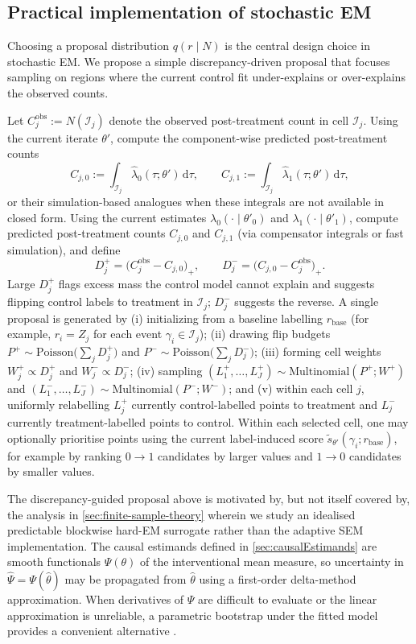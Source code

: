 \documentclass{statsoc}
\newcommand{\dd}{\mathrm{d}}
\newcommand{\1}{\mathbbm{1}}
\begin{document}
\subsection{Practical implementation of stochastic EM}\label{sec:pracImpSEM}

Choosing a proposal distribution \(q(r\mid N)\) is the central design choice in stochastic EM. We propose a simple discrepancy-driven proposal that focuses sampling on regions where the current control fit under-explains or over-explains the observed counts.

Let \(C_j^{\text{obs}}:=N(\mathcal I_j)\) denote the observed post-treatment count in cell \(\mathcal I_j\). Using the current iterate \(\theta'\), compute the component-wise predicted post-treatment counts
\[
C_{j,0}:=\int_{\mathcal I_j}\widehat\lambda_0(\tau;\theta')\,\dd\tau,
\qquad
C_{j,1}:=\int_{\mathcal I_j}\widehat\lambda_1(\tau;\theta')\,\dd\tau,
\]
or their simulation-based analogues when these integrals are not available in closed form. Using the current estimates \(\lambda_0(\cdot\mid\theta'_0)\) and \(\lambda_1(\cdot\mid\theta'_1)\), compute predicted post-treatment counts \(C_{j,0}\) and \(C_{j,1}\) (via compensator integrals or fast simulation), and define
\[
D_j^{+}=\bigl(C_j^{\text{obs}}-C_{j,0}\bigr)_+,
\qquad
D_j^{-}=\bigl(C_{j,0}-C_j^{\text{obs}}\bigr)_+.
\]
Large \(D_j^{+}\) flags excess mass the control model cannot explain and suggests flipping control labels to treatment in \(\mathcal I_j\); \(D_j^{-}\) suggests the reverse. A single proposal is generated by (i) initializing from a baseline labelling \(r_{\text{base}}\) (for example, \(r_i=Z_j\) for each event \(\gamma_i\in\mathcal I_j\)); (ii) drawing flip budgets \(P^{+}\sim\mathrm{Poisson}\!\bigl(\sum_j D_j^{+}\bigr)\) and \(P^{-}\sim\mathrm{Poisson}\!\bigl(\sum_j D_j^{-}\bigr)\); (iii) forming cell weights \(W_j^{+}\propto D_j^{+}\) and \(W_j^{-}\propto D_j^{-}\); (iv) sampling \((L_1^{+},\dots,L_J^{+})\sim\mathrm{Multinomial}(P^{+};W^{+})\) and \((L_1^{-},\dots,L_J^{-})\sim\mathrm{Multinomial}(P^{-};W^{-})\); and (v) within each cell \(j\), uniformly relabelling \(L_j^{+}\) currently control-labelled points to treatment and \(L_j^{-}\) currently treatment-labelled points to control. Within each selected cell, one may optionally prioritise points using the current label-induced score \(\tilde s_{\theta'}(\gamma_i;r_{\text{base}})\), for example by ranking \(0\to1\) candidates by larger values and \(1\to0\) candidates by smaller values.

The discrepancy-guided proposal above is motivated by, but not itself covered by, the analysis in \cref{sec:finite-sample-theory} wherein we study an idealised predictable blockwise hard-EM surrogate rather than the adaptive SEM implementation.  The causal estimands defined in \cref{sec:causalEstimands} are smooth functionals $\Psi(\theta)$ of the interventional mean measure, so uncertainty in $\hat\Psi=\Psi(\hat\theta)$ may be propagated from $\hat\theta$ using a first-order delta-method approximation. When derivatives of $\Psi$ are difficult to evaluate or the linear approximation is unreliable, a parametric bootstrap under the fitted model provides a convenient alternative \citep{davis2025multivariate}. 
\end{document}
